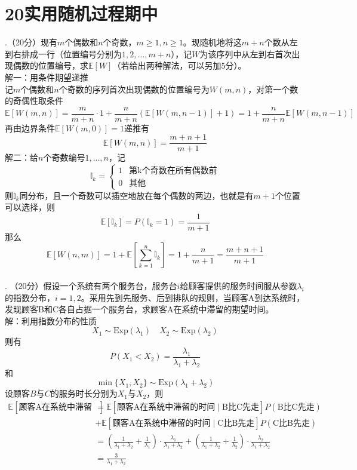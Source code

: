 \documentclass[UTF8,openany]{book}
\begin{document}
\section{\centering 20实用随机过程期中}
.（20分）现有$m$个偶数和$n$个奇数，$m \geq 1, n \geq 1$。现随机地将这$m+n$个数从左到右排成一行（位置编号分别为$1,2,\ldots,m+n$），记$W$为该序列中从左到右首次出现偶数的位置编号，求$\mathbb{E}[W]$（若给出两种解法，可以另加5分）。\\
解一：用条件期望递推\\
记$m$个偶数和$n$个奇数的序列首次出现偶数的位置编号为$W(m,n)$，对第一个数的奇偶性取条件
\[
\mathbb{E}[W(m,n)]= \frac{m}{m+n}\cdot 1+\frac{n}{m+n}\left(\mathbb{E}[W(m,n-1)]+1 \right)=1+\frac{n}{m+n}\mathbb{E}[W(m,n-1)] 
\]
再由边界条件$\mathbb{E}[W(m,0)]=1$递推有
\[
\mathbb{E}[W(m,n)]=\frac{m+n+1}{m+1}
\]
解二：给$n$个奇数编号$1,...,n$，记
\[
\mathbb{I}_k=
\begin{cases}
	1  &  \text{第k个奇数在所有偶数前} \\
	0  &  \text{其他}
\end{cases}
\]
则$\mathbb{I}_k$同分布，且一个奇数可以插空地放在每个偶数的两边，也就是有$m+1$个位置可以选择，则
\[
\mathbb{E}[\mathbb{I}_k]=P(\mathbb{I}_k=1)=\frac{1}{m+1}
\]
那么
\[
\mathbb{E}[W(n,m)]=1+\mathbb{E}\left[\sum_{k=1}^n  \mathbb{I}_k \right]=1+\frac{n}{m+1}=\frac{m+n+1}{m+1} 
\]\\


. （20分）假设一个系统有两个服务台，服务台$i$给顾客提供的服务时间服从参数$\lambda_i$的指数分布，$i=1,2$。采用先到先服务、后到排队的规则，当顾客A到达系统时，发现顾客B和C各自占据一个服务台，求顾客A在系统中滞留的期望时间。\\
解：利用指数分布的性质
\[
X_1\sim \mathrm{Exp}(\lambda_1) \quad X_2\sim \mathrm{Exp}(\lambda_2) 
\]
则有
\[
P(X_1<X_2)=\frac{\lambda_1}{\lambda_1+\lambda_2}
\]
和
\[
\min\{X_1,X_2\} \sim \mathrm{Exp}(\lambda_1+\lambda_2)
\]
设顾客$B$与$C$的服务时长分别为$X_1$与$X_2$，则
\begin{align*}
	\mathbb{E}\left[\text{顾客A在系统中滞留的时间} \right]  &= \mathbb{E}\left[\text{顾客A在系统中滞留的时间}\mid \text{B比C先走} \right]P(\text{B比C先走})\\
	&+\mathbb{E}\left[\text{顾客A在系统中滞留的时间}\mid \text{C比B先走} \right]P(\text{C比B先走}) \\
	& = \left(\frac{1}{\lambda_1+\lambda_2}+\frac{1}{\lambda_1} \right)\cdot \frac{\lambda_1}{\lambda_1+\lambda_2}+ \left(\frac{1}{\lambda_1+\lambda_2}+\frac{1}{\lambda_2} \right)\cdot \frac{\lambda_2}{\lambda_1+\lambda_2}\\
	&=\frac{3}{\lambda_1+\lambda_2}
\end{align*}\\
\end{document}
